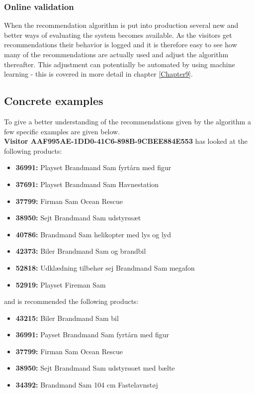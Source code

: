 \subsubsection{Online validation}
When the recommendation algorithm is put into production several new and better ways of evaluating the system becomes available. As the visitors get recommendations their behavior is logged and it is therefore easy to see how many of the recommendations are actually used and adjust the algorithm thereafter.
This adjustment can potentially be automated by using machine learning - this is covered in more detail in chapter \ref{Chapter9}.

\subsection{Concrete examples}
To give a better understanding of the recommendations given by the algorithm a few specific examples are given below. \\

\textbf{Visitor AAF995AE-1DD0-41C6-898B-9CBEE884E553} has looked at the following products:
\begin{itemize}
\item \textbf{36991: }Playset Brandmand Sam fyrtårn med figur
\item \textbf{37691: }Playset Brandmand Sam Havnestation
\item \textbf{37799: }Firman Sam Ocean Rescue
\item \textbf{38950: }Sejt Brandmand Sam udstyrssæt
\item \textbf{40786: }Brandmand Sam helikopter med lys og lyd
\item \textbf{42373: }Biler Brandmand Sam og brandbil
\item \textbf{52818: }Udklædning tilbehør sej Brandmand Sam megafon
\item \textbf{52919: }Playset Fireman Sam
\end{itemize}
and is recommended the following products:
\begin{itemize}
\item \textbf{43215: }Biler Brandmand Sam bil
\item \textbf{36991: }Payset Brandmand Sam fyrtårn med figur
\item \textbf{37799: }Firman Sam Ocean Rescue
\item \textbf{38950: }Sejt Brandmand Sam udstyrssæt med bælte
\item \textbf{34392:} Brandmand Sam 104 cm Fastelavnstøj
\end{itemize}

